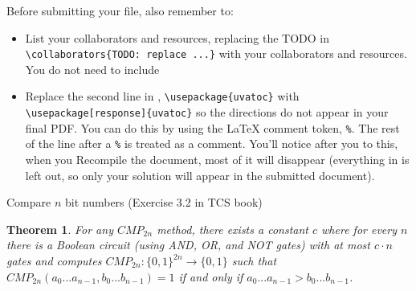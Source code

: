 \documentclass[11pt]{article}
\begin{document}
{Before submitting your  file, also remember to:
\begin{itemize}
\item List your collaborators and resources, replacing the TODO in {\texttt{\textbackslash collaborators\{TODO: replace ...\}}} with your collaborators and resources. You do not need to include

\item Replace the second line in , \texttt{\textbackslash usepackage\{uvatoc\}} with \texttt{\textbackslash usepackage[response]\{uvatoc\}} so the directions do not appear in your final PDF. You can do this by using the LaTeX comment token, {\texttt{\%}}. The rest of the line after a {\texttt{\%}} is treated as a comment. You'll notice after you to this, when you Recompile the document, most of it will disappear (everything in  is left out, so only your solution will appear in the submitted document).
\end{itemize}
}



\begin{problem}
Compare $n$ bit numbers \rm (Exercise 3.2 in TCS book)
\end{problem}


\newtheorem{theorem}{Theorem}

\begin{theorem}
For any $CMP_{2n}$ method, there exists a constant $c$ where for every $n$ there is a Boolean circuit (using AND, OR, and NOT gates) with at most $c \cdot n$ gates and computes $CMP_{2n} : \{0, 1\}^{2n} \rightarrow \{0,1\}$ such that $CMP_{2n}(a_0 ... a_{n-1}, b_0 ... b_{n-1}) = 1$ if and only if $a_0 ... a_{n-1} > b_0 ... b_{n-1}$.
\end{theorem}
\end{document}

